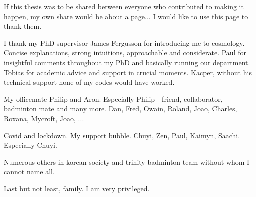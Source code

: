 
\begin{acknowledgements}      

If this thesis was to be shared between everyone who contributed to making it happen, my own share would be about a page... I would like to use this page to thank them.

I thank my PhD supervisor James Fergusson for introducing me to cosmology. Concise explanations, strong intuitions, approachable and considerate. Paul for insightful comments throughout my PhD and basically running our department. Tobias for academic advice and support in crucial moments. Kacper, without his technical support none of my codes would have worked.

My officemate Philip and Aron. Especially Philip - friend, collaborator, badminton mate and many more. Dan, Fred, Owain, Roland, Joao, Charles, Roxana, Mycroft, Joao, ...

Covid and lockdown. My support bubble. Chuyi, Zen, Paul, Kaimyn, Saachi. Especially Chuyi.

Numerous others in korean society and trinity badminton team without whom I cannot name all.

Last but not least, family. I am very privileged.


\end{acknowledgements}

